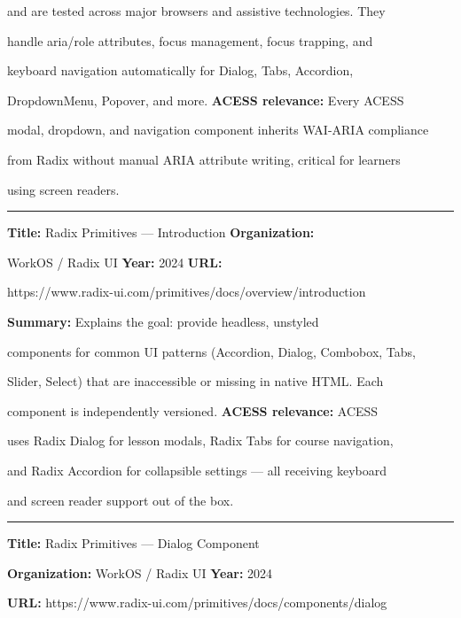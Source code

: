 \documentclass[12pt, oneside]{article} %
\begin{document}
and are tested across major browsers and assistive technologies. They

handle aria/role attributes, focus management, focus trapping, and

keyboard navigation automatically for Dialog, Tabs, Accordion,

DropdownMenu, Popover, and more. \textbf{ACESS relevance:} Every ACESS

modal, dropdown, and navigation component inherits WAI-ARIA compliance

from Radix without manual ARIA attribute writing, critical for learners

using screen readers.



\begin{center}\rule{0.5\linewidth}{0.5pt}\end{center}



\textbf{Title:} Radix Primitives --- Introduction \textbf{Organization:}

WorkOS / Radix UI \textbf{Year:} 2024 \textbf{URL:}

https://www.radix-ui.com/primitives/docs/overview/introduction

\textbf{Summary:} Explains the goal: provide headless, unstyled

components for common UI patterns (Accordion, Dialog, Combobox, Tabs,

Slider, Select) that are inaccessible or missing in native HTML. Each

component is independently versioned. \textbf{ACESS relevance:} ACESS

uses Radix Dialog for lesson modals, Radix Tabs for course navigation,

and Radix Accordion for collapsible settings --- all receiving keyboard

and screen reader support out of the box.



\begin{center}\rule{0.5\linewidth}{0.5pt}\end{center}



\textbf{Title:} Radix Primitives --- Dialog Component

\textbf{Organization:} WorkOS / Radix UI \textbf{Year:} 2024

\textbf{URL:} https://www.radix-ui.com/primitives/docs/components/dialog
\end{document}
